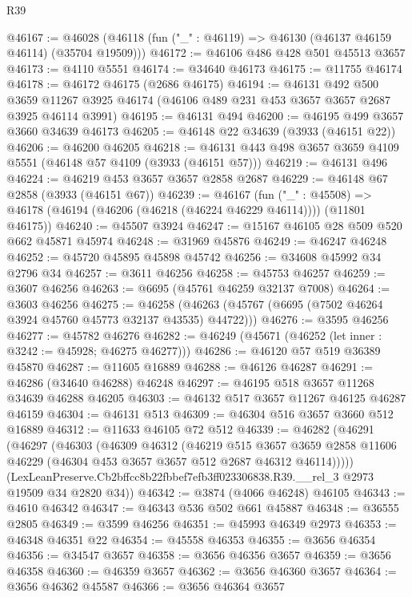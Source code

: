 \begin{lexlean}{R39}
\begin{coremodule}
@46167 := @46028 (@46118 (fun ("_" : @46119) => @46130 (@46137 @46159 @46114) (@35704 @19509)))
@46172 := @46106 @486 @428 @501 @45513 @3657
@46173 := @4110 @5551
@46174 := @34640 @46173
@46175 := @11755 @46174
@46178 := @46172 @46175 (@2686 @46175)
@46194 := @46131
    @492
    @500
    @3659
    @11267
    @3925
    @46174
    (@46106 @489 @231 @453 @3657 @3657 @2687 @3925 @46114 @3991)
@46195 := @46131 @494
@46200 := @46195 @499 @3657 @3660 @34639 @46173
@46205 := @46148 @22 @34639 (@3933 (@46151 @22))
@46206 := @46200 @46205
@46218 := @46131 @443 @498 @3657 @3659 @4109 @5551 (@46148 @57 @4109 (@3933 (@46151 @57)))
@46219 := @46131 @496
@46224 := @46219 @453 @3657 @3657 @2858 @2687
@46229 := @46148 @67 @2858 (@3933 (@46151 @67))
@46239 := @46167
    (fun ("_" : @45508) => @46178 (@46194 (@46206 (@46218 (@46224 @46229 @46114)))) (@11801 @46175))
@46240 := @45507 @3924
@46247 := @15167 @46105 @28 @509 @520 @662 @45871 @45974
@46248 := @31969 @45876
@46249 := @46247 @46248
@46252 := @45720 @45895 @45898 @45742
@46256 := @34608 @45992 @34 @2796 @34
@46257 := @3611 @46256
@46258 := @45753 @46257
@46259 := @3607 @46256
@46263 := @6695 (@45761 @46259 @32137 @7008)
@46264 := @3603 @46256
@46275 := @46258 (@46263 (@45767 (@6695 (@7502 @46264 @3924 @45760 @45773 @32137 @43535) @44722)))
@46276 := @3595 @46256
@46277 := @45782 @46276
@46282 := @46249 (@45671 (@46252 (let inner : @3242 := @45928; @46275 @46277)))
@46286 := @46120 @57 @519 @36389 @45870
@46287 := @11605 @16889
@46288 := @46126 @46287
@46291 := @46286 (@34640 @46288) @46248
@46297 := @46195 @518 @3657 @11268 @34639 @46288 @46205
@46303 := @46132 @517 @3657 @11267 @46125 @46287 @46159
@46304 := @46131 @513
@46309 := @46304 @516 @3657 @3660 @512 @16889
@46312 := @11633 @46105 @72 @512
@46339 := @46282
    (@46291
      (@46297
        (@46303
          (@46309
            @46312
            (@46219
              @515
              @3657
              @3659
              @2858
              @11606
              @46229
              (@46304 @453 @3657 @3657 @512 @2687 @46312 @46114)))))
      (LexLeanPreserve.Cb2bffcc8b22fbbef7efb3ff023306838.R39.__rel_3 @2973 @19509 @34 @2820 @34))
@46342 := @3874 (@4066 @46248) @46105
@46343 := @4610 @46342
@46347 := @46343 @536 @502 @661 @45887
@46348 := @36555 @2805
@46349 := @3599 @46256
@46351 := @45993 @46349 @2973
@46353 := @46348 @46351 @22
@46354 := @45558 @46353
@46355 := @3656 @46354
@46356 := @34547 @3657
@46358 := @3656 @46356 @3657
@46359 := @3656 @46358
@46360 := @46359 @3657
@46362 := @3656 @46360 @3657
@46364 := @3656 @46362 @45587
@46366 := @3656 @46364 @3657

\end{coremodule}
\end{lexlean}
